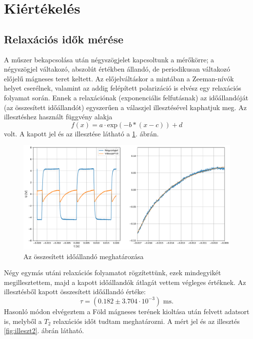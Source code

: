 \documentclass[12pt,a4paper]{article}
\begin{document}
\section{Kiértékelés}
\subsection{Relaxációs idők mérése}
\hspace*{10pt} A műszer bekapcsolása után négyszögjelet kapcsoltunk a mérőkörre; a négyszögjel váltakozó, abszolút értékben állandó, de periodikusan váltakozó előjelű mágneses teret keltett. Az előjelváltáskor a mintában a Zeeman-nívók helyet cserélnek, valamint az addig felépített polarizáció is elvész egy relaxációs folyamat során. Ennek a relaxációnak (exponenciális felfutásnak) az időállandóját (az összesített időállandót) egyszerűen a válaszjel illesztésével kaphatjuk meg. Az illesztéshez használt függvény alakja
\begin{equation}
f(x)=a\cdot \textrm{exp}(-b*(x-c))+d
\end{equation}
volt. A kapott jel és az illesztése látható a \ref{fig:illeszt1}. ábrán.\\
\begin{figure}[!h]
\centering
\hspace*{-0.5cm}
\includegraphics[scale=0.45]{tau_ill}
\caption{Az összesített időállandó meghatározása}
\label{fig:illeszt1}
\end{figure}
 \newline
 Négy egymás utáni relaxációs folyamatot rögzítettünk, ezek mindegyikét megillesztettem, majd a kapott időállandók átlagát vettem végleges értéknek. Az illesztésből kapott összesített időállandó értéke:
 $$\tau = (0.182 \pm 3.704\cdot 10^{-3}) \textrm{ ms} .$$
 Hasonló módon elvégeztem a Föld mágneses terének kioltása után felvett adatsort is, melyből a $T_2$ relaxációs időt tudtam meghatározni. A mért jel és az illesztés \ref{fig:illeszt2}. ábrán látható. \\
\end{document}
